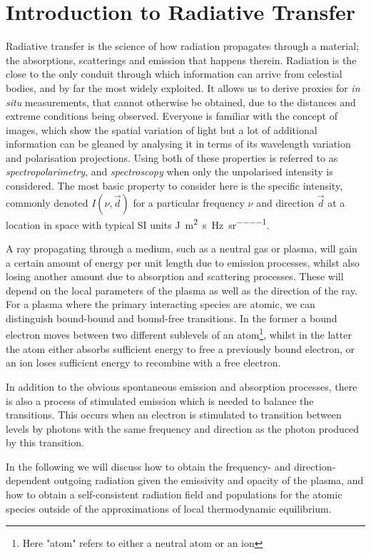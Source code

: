 \section{Introduction to Radiative Transfer}

Radiative transfer is the science of how radiation propagates through a material; the absorptions, scatterings and emission that happens therein.
Radiation is the close to the only conduit through which information can arrive from celestial bodies, and by far the most widely exploited.
It allows us to derive proxies for \emph{in situ} measurements, that cannot otherwise be obtained, due to the distances and extreme conditions being observed.
Everyone is familiar with the concept of images, which show the spatial variation of light but a lot of additional information can be gleaned by analysing it in terms of its wavelength variation and polarisation projections.
Using both of these properties is referred to as \emph{spectropolarimetry}, and \emph{spectroscopy} when only the unpolarised intensity is considered.
The most basic property to consider here is the specific intensity, commonly denoted $I(\nu, \vec{d})$ for a particular frequency $\nu$ and direction $\vec{d}$ at a location in space with typical SI units \si{\joule\per\square\metre\per\s\per\hertz\per\steradian}.

A ray propagating through a medium, such as a neutral gas or plasma, will gain a certain amount of energy per unit length due to emission processes, whilst also losing another amount due to absorption and scattering processes. These will depend on the local parameters of the plasma as well as the direction of the ray. For a plasma where the primary interacting species are atomic, we can distinguish bound-bound and bound-free transitions. In the former a bound electron moves between two different sublevels of an atom\footnote{Here "atom" refers to either a neutral atom or an ion}, whilst in the latter the atom either absorbs sufficient energy to free a previously bound electron, or an ion loses sufficient energy to recombine with a free electron.

In addition to the obvious spontaneous emission and absorption processes, there is also a process of stimulated emission which is needed to balance the transitions. This occurs when an electron is stimulated to transition between levels by photons with the same frequency and direction as the photon produced by this transition.

In the following we will discuss how to obtain the frequency- and direction-dependent outgoing radiation given the emissivity and opacity of the plasma, and how to obtain a self-consistent radiation field and populations for the atomic species outside of the approximations of local thermodynamic equilibrium.

